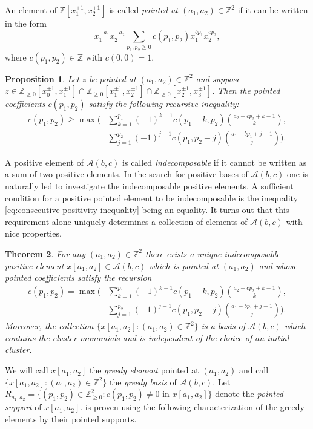 \documentclass[11pt]{amsart}
\newtheorem{theorem}{Theorem}[section]
\newtheorem{prop}[theorem]{Proposition}
\theoremstyle{remark}
\numberwithin{equation}{section}
\newcommand{\ZZ}{\mathbb{Z}}
\newcommand{\cA}{\mathcal{A}}
\begin{document}
An element of $\ZZ[x_1^{\pm1},x_2^{\pm1}]$ is called \emph{pointed at
$(a_1,a_2)\in\ZZ^2$} if it can be written in the form
\[
  x_1^{-a_1}x_2^{-a_2}\sum\limits_{p_1,p_2\ge0}c(p_1,p_2)x_1^{bp_1}x_2^{cp_2},
\]
where $c(p_1,p_2)\in\ZZ$ with $c(0,0)=1$.   
\begin{prop}\cite[Proposition~1.5]{LLZ}
  Let $z$ be pointed at $(a_1,a_2)\in\ZZ^2$ and suppose
  $z\in\ZZ_{\ge0}[x_0^{\pm1},x_1^{\pm1}]
  \cap\ZZ_{\ge0}[x_1^{\pm1},x_2^{\pm1}]
  \cap\ZZ_{\ge0}[x_2^{\pm1},x_3^{\pm1}]$.
  Then the pointed coefficients $c(p_1,p_2)$ satisfy the following recursive
  inequality:
  \begin{align}
    \label{eq:consecutive positivity inequality}
    c(p_1,p_2)\ge\max\bigg(
    &\sum\limits_{k=1}^{p_1} (-1)^{k-1}c(p_1-k,p_2){a_2-cp_2+k-1\choose k},\\
    \nonumber&\sum\limits_{ j =1}^{p_2} (-1)^{ j -1}c(p_1,p_2- j ){a_1-bp_1+ j -1\choose  j }\bigg).
  \end{align}
\end{prop}
A positive element of $\cA(b,c)$ is called \emph{indecomposable} if it cannot
be written as a sum of two positive elements.  In the search for positive bases
of $\cA(b,c)$ one is naturally led to investigate the indecomposable positive
elements.  A sufficient condition for a positive pointed element to be
indecomposable is the inequality \eqref{eq:consecutive positivity inequality}
being an equality.  It turns out that this requirement alone uniquely determines
a collection of elements of $\cA(b,c)$ with nice properties.

\begin{theorem}\label{th:greedy}\cite[Theorem~1.7]{LLZ}
  For any $(a_1,a_2)\in\ZZ^2$ there exists a unique indecomposable positive
  element $x[a_1,a_2]\in\cA(b,c)$ which is pointed at $(a_1,a_2)$ and whose
  pointed coefficients satisfy the recursion
  \begin{align}
    \label{eq:greey recursion}
    c(p_1,p_2)=\max\bigg(
    &\sum\limits_{k=1}^{p_1} (-1)^{k-1}c(p_1-k,p_2){a_2-cp_2+k-1\choose k},\\
    \nonumber&\sum\limits_{ j =1}^{p_2} (-1)^{ j -1}c(p_1,p_2- j ){a_1-bp_1+ j -1\choose  j }\bigg).
  \end{align}
  Moreover, the collection $\{x[a_1,a_2]:(a_1,a_2)\in\ZZ^2\}$ is a basis of
  $\cA(b,c)$ which contains the cluster monomials and is independent of the
  choice of an initial cluster.
\end{theorem}
We will call $x[a_1,a_2]$ the \emph{greedy element} pointed at $(a_1,a_2)$ and
call $\{x[a_1,a_2]:(a_1,a_2)\in\ZZ^2\}$ the \emph{greedy basis} of $\cA(b,c)$.  Let
$R_{a_1,a_2}=\{(p_1,p_2)\in\ZZ_{\ge0}^2:c(p_1,p_2)\ne0 \text{ in } x[a_1,a_2]\}$ denote
the \emph{pointed support} of $x[a_1,a_2]$.   is proven using the following characterization of the greedy elements by their
pointed supports.
\end{document}
